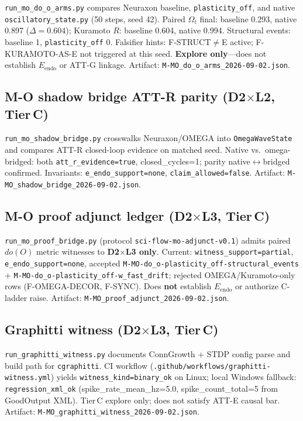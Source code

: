 \texttt{run\_mo\_do\_o\_arms.py} compares Neuraxon baseline, \texttt{plasticity\_off}, and native \texttt{oscillatory\_state.py} (50 steps, seed 42). Paired $\Omega_t$ final: baseline 0.293, native 0.897 ($\Delta{=}0.604$); Kuramoto $R$: baseline 0.604, native 0.994. Structural events: baseline 1, \texttt{plasticity\_off} 0. Falsifier hints: F-STRUCT$\neq$E active; F-KURAMOTO-AS-E not triggered at this seed. \textbf{Explore only}---does not establish $E_{\mathrm{endo}}$ or ATT-G linkage. Artifact: \texttt{M-MO\_do\_o\_arms\_2026-09-02.json}.

\subsection{M-O shadow bridge ATT-R parity (D2$\times$L2, Tier\,C)}

\texttt{run\_mo\_shadow\_bridge.py} crosswalks Neuraxon/OMEGA into \texttt{OmegaWaveState} and compares ATT-R closed-loop evidence on matched seed. Native vs.\ omega-bridged: both \texttt{att\_r\_evidence=true}, closed\_cycles=1; parity native$\leftrightarrow$bridged confirmed. Invariants: \texttt{e\_endo\_support=none}, \texttt{claim\_allowed=false}. Artifact: \texttt{M-MO\_shadow\_bridge\_2026-09-02.json}.

\subsection{M-O proof adjunct ledger (D2$\times$L3, Tier\,C)}

\texttt{run\_mo\_proof\_bridge.py} (protocol \texttt{sci-flow-mo-adjunct-v0.1}) admits paired $do(O)$ metric witnesses to \textbf{D2$\times$L3 only}. Current: \texttt{witness\_support=partial}, \texttt{e\_endo\_support=none}, accepted \texttt{M-MO-do\_o-plasticity\_off-structural\_events} + \texttt{M-MO-do\_o-plasticity\_off-w\_fast\_drift}; rejected OMEGA/Kuramoto-only rows (F-OMEGA-DECOR, F-SYNC). Does \textbf{not} establish $E_{\mathrm{endo}}$ or authorize C-ladder raise. Artifact: \texttt{M-MO\_proof\_adjunct\_2026-09-02.json}.

\subsection{Graphitti witness (D2$\times$L3, Tier\,C)}

\texttt{run\_graphitti\_witness.py} documents ConnGrowth + STDP config parse and build path for \texttt{cgraphitti}. CI workflow (\texttt{.github/workflows/graphitti-witness.yml}) yields \texttt{witness\_kind=binary\_ok} on Linux; local Windows fallback: \texttt{regression\_xml\_ok} (spike\_rate\_mean\_hz=5.0, spike\_count\_total=5 from GoodOutput XML). Tier\,C explore only; does not satisfy ATT-E causal bar. Artifact: \texttt{M-MO\_graphitti\_witness\_2026-09-02.json}.

